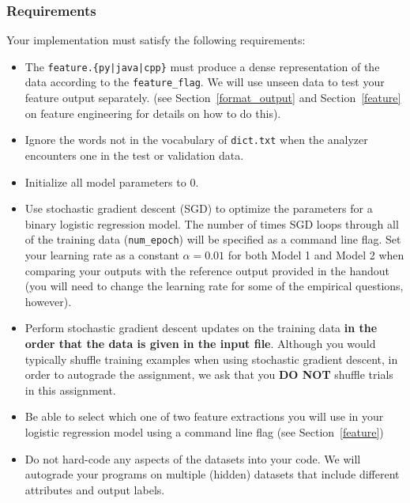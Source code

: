 \documentclass[11pt,addpoints,answers]{exam}
\begin{document}
\subsubsection{Requirements}
Your implementation must satisfy the following requirements:
\begin{itemize}
    \item The \texttt{feature.\{py|java|cpp\}} must produce a dense representation of the data according to the \texttt{feature\_flag}. We will use unseen data to test your feature output separately. (see Section~\ref{format_output} and Section~\ref{feature} on feature engineering for details on how to do this). 
    \item Ignore the words not in the vocabulary of \lstinline{dict.txt} when the analyzer encounters one in the test or validation data.
    \item Initialize all model parameters to $0$.
    \item Use stochastic gradient descent (SGD) to optimize the parameters for a binary logistic regression model. The number of times SGD loops through all of the training data (\texttt{num\_epoch}) will be specified as a command line flag. Set your learning rate as a constant $\alpha = 0.01$ for both Model 1 and Model 2 when comparing your outputs with the reference output provided in the handout (you will need to change the learning rate for some of the empirical questions, however).
    \item Perform stochastic gradient descent updates on the training data \textbf{in the order that the data is given in the input file}. Although you would typically shuffle training examples when using stochastic gradient descent, in order to autograde the assignment, we ask that you {\bf DO NOT} shuffle trials in this assignment.
    \item Be able to select which one of two feature extractions you will use in your logistic regression model using a command line flag (see Section~\ref{feature})
    \item Do not hard-code any aspects of the datasets into your code. We will autograde your programs on multiple (hidden) datasets that include different attributes and output labels.
\end{itemize}
\end{document}
